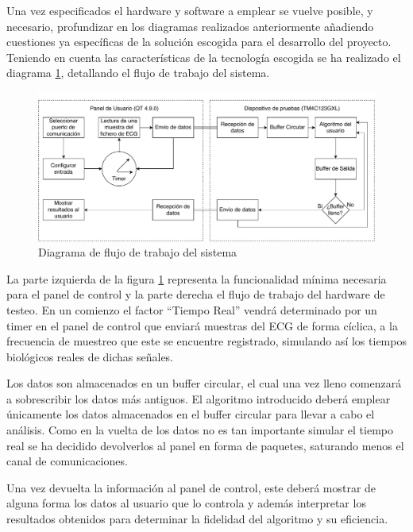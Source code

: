         Una vez especificados el hardware y software a emplear se vuelve posible, y necesario, profundizar en los diagramas realizados anteriormente añadiendo cuestiones ya específicas de la solución escogida para el desarrollo del proyecto. Teniendo en cuenta las características de la tecnología escogida se ha realizado el diagrama \ref{fig:InternalBlocksDiagram}, detallando el flujo de trabajo del sistema.

        \begin{figure}[H]  
            \centering
                \includegraphics[width =\linewidth]{figuras/InternBlockDiagram.pdf}
                \caption{Diagrama de flujo de trabajo del sistema}
                \label{fig:InternalBlocksDiagram}
        \end{figure}
 
        La parte izquierda de la figura \ref{fig:InternalBlocksDiagram} representa la funcionalidad mínima necesaria para el panel de control y la parte derecha el flujo de trabajo del hardware de testeo. En un comienzo el factor “Tiempo Real” vendrá determinado por un timer en el panel de control que enviará muestras del ECG de forma cíclica, a la frecuencia de muestreo que este se encuentre registrado, simulando así los tiempos biológicos reales de dichas señales. 
        
        Los datos son almacenados en un buffer circular, el cual una vez lleno comenzará a sobrescribir los datos más antiguos. El algoritmo introducido deberá emplear únicamente los datos almacenados en el buffer circular para llevar a cabo el análisis. Como en la vuelta de los datos no es tan importante simular el tiempo real se ha decidido devolverlos al panel en forma de paquetes, saturando menos el canal de comunicaciones.
        
        Una vez devuelta la información al panel de control, este deberá mostrar de alguna forma los datos al usuario que lo controla y además interpretar los resultados obtenidos para determinar la fidelidad del algoritmo y su eficiencia.        

